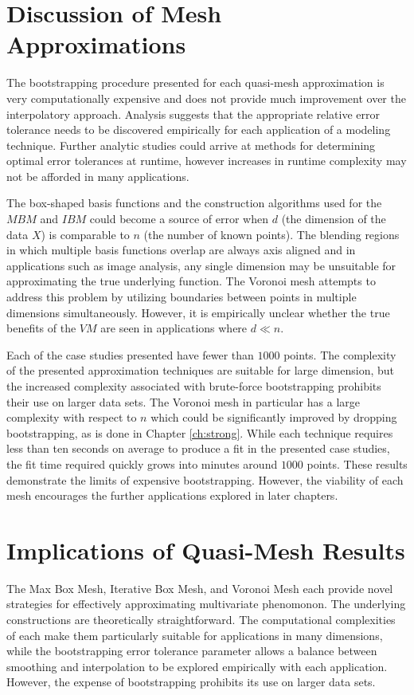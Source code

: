 \section{Discussion of Mesh Approximations}

The bootstrapping procedure presented for each quasi-mesh approximation is very computationally expensive and does not provide much improvement over the interpolatory approach. Analysis suggests that the appropriate relative error tolerance needs to be discovered empirically for each application of a modeling technique. Further analytic studies could arrive at methods for determining optimal error tolerances at runtime, however increases in runtime complexity may not be afforded in many applications. 

The box-shaped basis functions and the construction algorithms used for the $MBM$ and $IBM$ could become a source of error when $d$ (the dimension of the data $X$) is comparable to $n$ (the number of known points). The blending regions in which multiple basis functions overlap are always axis aligned and in applications such as image analysis, any single dimension may be unsuitable for approximating the true underlying function. The Voronoi mesh attempts to address this problem by utilizing boundaries between points in multiple dimensions simultaneously. However, it is empirically unclear whether the true benefits of the $VM$ are seen in applications where $d \ll n$.

Each of the case studies presented have fewer than $1000$ points. The complexity of the presented approximation techniques are suitable for large dimension, but the increased complexity associated with brute-force bootstrapping prohibits their use on larger data sets. The Voronoi mesh in particular has a large complexity with respect to $n$ which could be significantly improved by dropping bootstrapping, as is done in Chapter \ref{ch:strong}. While each technique requires less than ten seconds on average to produce a fit in the presented case studies, the fit time required quickly grows into minutes around $1000$ points. These results demonstrate the limits of expensive bootstrapping. However, the viability of each mesh encourages the further applications explored in later chapters.

\section{Implications of Quasi-Mesh Results}

The Max Box Mesh, Iterative Box Mesh, and Voronoi Mesh each provide novel strategies for effectively approximating multivariate phenomonon. The underlying constructions are theoretically straightforward. The computational complexities of each make them particularly suitable for applications in many dimensions, while the bootstrapping error tolerance parameter allows a balance between smoothing and interpolation to be explored empirically with each application. However, the expense of bootstrapping prohibits its use on larger data sets.

